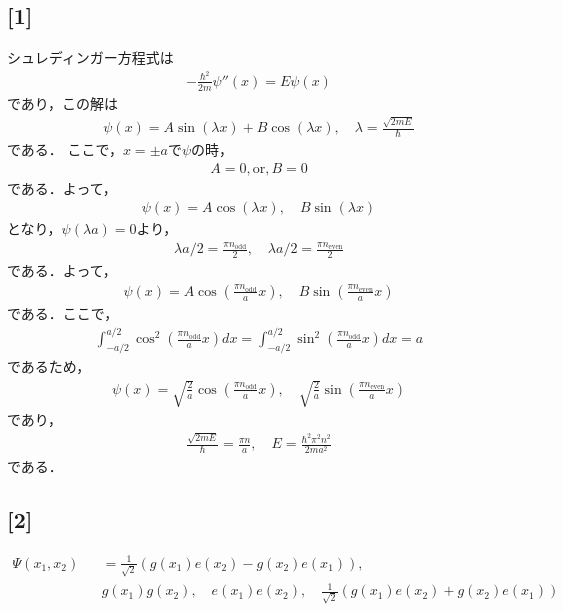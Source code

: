 \documentclass[12pt,dvipdfmx]{jsarticle}
\begin{document}
\subsection*{\large{[1]}}

シュレディンガー方程式は
\begin{eqnarray}
  -\frac{\hbar^2}{2m}\psi''(x) = E\psi(x)
\end{eqnarray}
であり，この解は
\begin{eqnarray}
  \psi(x) = A\sin(\lambda x) + B\cos(\lambda x),\quad \lambda = \frac{\sqrt{2mE}}{\hbar}
\end{eqnarray}
である．
ここで，$x=\pm a$で$\psi$の時，
\begin{eqnarray}
  A = 0 , \text{or} , B=0
\end{eqnarray}
である．よって，
\begin{eqnarray}
  \psi(x) = A\cos(\lambda x),\quad B\sin(\lambda x)
\end{eqnarray}
となり，$\psi(\lambda a)=0$より，
\begin{eqnarray}
  \lambda a/2 = \frac{\pi n_{\text{odd}}}{2}, \quad \lambda a/2= \frac{\pi n_{\text{even}}}{2}
\end{eqnarray}
である．よって，
\begin{eqnarray}
  \psi(x) = A\cos\left( \frac{\pi n_{\text{odd}}}{a} x \right), \quad B\sin\left( \frac{\pi n_{\text{even}}}{a} x \right)
\end{eqnarray}
である．ここで，
\begin{eqnarray}
  \int_{-a/2}^{a/2} \cos^2\left( \frac{\pi n_{\text{odd}}}{a} x \right)dx = \int_{-a/2}^{a/2} \sin^2\left( \frac{\pi n_{\text{odd}}}{a} x \right)dx= a
\end{eqnarray}
であるため，
\begin{eqnarray}
  \psi(x) = \sqrt{\frac{2}{a}}\cos\left( \frac{\pi n_{\text{odd}}}{a} x \right), \quad \sqrt{\frac{2}{a}}\sin\left( \frac{\pi n_{\text{even}}}{a} x \right)
\end{eqnarray}
であり，
\begin{eqnarray}
  \frac{\sqrt{2mE}}{\hbar}= \frac{\pi n}{a}, \quad E = \frac{\hbar^2 \pi^2 n^2}{2ma^2}
\end{eqnarray}
である．
\subsection*{\large{[2]}}
\begin{eqnarray}
  \Psi(x_1,x_2) &&= \frac{1}{\sqrt{2}}\left( g(x_1)e(x_2)-g(x_2)e(x_1) \right),\\
  &&g(x_1)g(x_2), \quad e(x_1)e(x_2), \quad \frac{1}{\sqrt{2}}\left( g(x_1)e(x_2)+g(x_2)e(x_1) \right)
\end{eqnarray}
\end{document}
